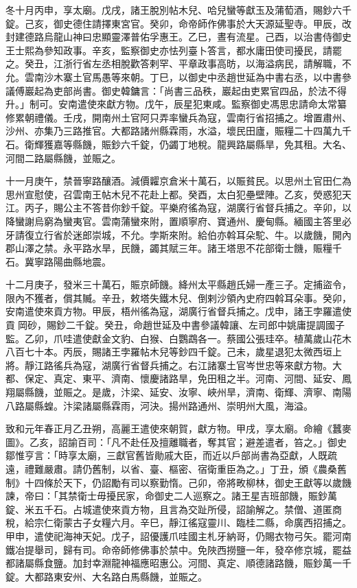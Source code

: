 \begin{pinyinscope}
 冬十月丙申，享太廟。戊戌，諸王脫別帖木兒、哈兒蠻等獻玉及蒲萄酒，賜鈔六千錠。己亥，御史德住請擇東宮官。癸卯，命帝師作佛事於大天源延聖寺。甲辰，改封建德路烏龍山神曰忠顯靈澤普佑孚惠王。乙巳，晝有流星。己酉，以治書侍御史王士熙為參知政事。辛亥，監察御史亦怯列臺卜答言，都水庸田使司擾民，請罷之。癸丑，江浙行省左丞相脫歡答剌罕、平章政事高昉，以海溢病民，請解職，不允。雲南沙木寨土官馬愚等來朝。丁巳，以御史中丞趙世延為中書右丞，以中書參議傅巖起為吏部尚書。御史韓鏞言：「尚書三品秩，巖起由吏累官四品，於法不得升。」制可。安南遣使來獻方物。戊午，辰星犯東咸。監察御史馮思忠請命太常纂修累朝禮儀。壬戌，開南州土官阿只弄率蠻兵為寇，雲南行省招捕之。增置肅州、沙州、亦集乃三路推官。大都路諸州縣霖雨，水溢，壞民田廬，賑糧二十四萬九千石。衛輝獲嘉等縣饑，賑鈔六千錠，仍蠲丁地稅。龍興路屬縣旱，免其租。大名、河間二路屬縣饑，並賑之。



 十一月庚午，禁晉寧路釀酒。減價糶京倉米十萬石，以賑貧民。以思州土官田仁為思州宣慰使，召雲南王帖木兒不花赴上都。癸酉，太白犯壘壁陣。乙亥，熒惑犯天江。丙子，賜公主不答昔你鈔千錠。平樂府徭為寇，湖廣行省督兵捕之。辛卯，以降蠻謝烏窮為蠻夷官。雲南蒲蠻來附，置順寧府、寶通州、慶甸縣。緬國主答里必牙請復立行省於迷郎崇城，不允。孛斯來附。給伯亦斡耳朵駝、牛。以歲饑，開內郡山澤之禁。永平路水旱，民饑，蠲其賦三年。諸王塔思不花部衛士饑，賑糧千石。冀寧路陽曲縣地震。



 十二月庚子，發米三十萬石，賑京師饑。絳州太平縣趙氏婦一產三子。定捕盜令，限內不獲者，償其贓。辛丑，敕塔失鐵木兒、倒剌沙領內史府四斡耳朵事。癸卯，安南遣使來貢方物。甲辰，梧州徭為寇，湖廣行省督兵捕之。戊申，諸王孛羅遣使貢岡砂，賜鈔二千錠。癸丑，命趙世延及中書參議韓讓、左司郎中姚庸提調國子監。乙卯，爪哇遣使獻金文豹、白猴、白鸚鵡各一。蔡國公張珪卒。植萬歲山花木八百七十本。丙辰，賜諸王孛羅帖木兒等鈔四千錠。己未，歲星退犯太微西垣上將。靜江路徭兵為寇，湖廣行省督兵捕之。右江諸寨土官岑世忠等來獻方物。大都、保定、真定、東平、濟南、懷慶諸路旱，免田租之半。河南、河間、延安、鳳翔屬縣饑，並賑之。是歲，汴梁、延安、汝寧、峽州旱，濟南、衛輝、濟寧、南陽八路屬縣蝗。汴梁諸屬縣霖雨，河決。揚州路通州、崇明州大風，海溢。



 致和元年春正月乙丑朔，高麗王遣使來朝賀，獻方物。甲戌，享太廟。命繪《蠶麥圖》。乙亥，詔諭百司：「凡不赴任及擅離職者，奪其官；避差遣者，笞之。」御史鄒惟亨言：「時享太廟，三獻官舊皆勛戚大臣，而近以戶部尚書為亞獻，人既疏遠，禮難嚴肅。請仍舊制，以省、臺、樞密、宿衛重臣為之。」丁丑，頒《農桑舊制》十四條於天下，仍詔勵有司以察勤惰。己卯，帝將畋柳林，御史王獻等以歲饑諫，帝曰：「其禁衛士毋擾民家，命御史二人巡察之。諸王星吉班部饑，賑鈔萬錠、米五千石。占城遣使來貢方物，且言為交趾所侵，詔諭解之。禁僧、道匿商稅，給宗仁衛蒙古子女糧六月。辛巳，靜江徭寇靈川、臨桂二縣，命廣西招捕之。甲申，遣使祀海神天妃。戊子，詔優護爪哇國主札牙納哥，仍賜衣物弓矢。罷河南鐵冶提舉司，歸有司。命帝師修佛事於禁中。免陜西撈鹽一年，發卒修京城，罷益都諸屬縣食鹽。加封幸淵龍神福應昭惠公。河間、真定、順德諸路饑，賑鈔萬一千錠。大都路東安州、大名路白馬縣饑，並賑之。




\end{pinyinscope}
